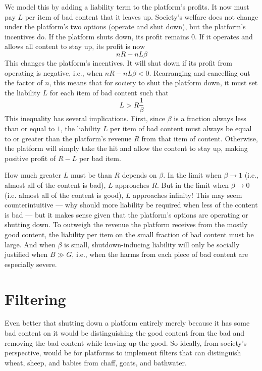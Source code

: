 \documentclass{article}
\begin{document}
We model this by adding a liability term to the platform's profits. It now must pay $L$ per item of bad content that it leaves up. Society's welfare does not change under the platform's two options (operate and shut down), but the platform's incentives do. If the platform shuts down, its profit remains $0$.  If it operates and allows all content to stay up, its  profit is now 
\begin{equation}
\label{profnofilter}
nR - nL\beta
\end{equation}
This changes the platform's incentives. It will shut down if its profit from operating is negative, i.e., when $nR - nL\beta < 0$. Rearranging and cancelling out the factor of $n$, this means that for society to shut the platform down, it must set the liability $L$ for each item of bad content such that
\begin{equation*}
L > R\frac{1}{\beta}
\end{equation*}
This inequality has several implications. First, since $\beta$ is a fraction always less than or equal to $1$, the liability $L$ per item of bad content must always be equal to or greater than the platform's revenue $R$ from that item of content. Otherwise, the platform will simply take the hit and allow the content to stay up, making positive profit of $R -L$ per bad item.

How much greater $L$ must be than $R$ depends on $\beta$. In the limit when $\beta \rightarrow 1$ (i.e., almost all of the content is bad), $L$ approaches $R$. But in the limit when $\beta \rightarrow 0$ (i.e. almost all of the content is good), $L$ approaches infinity! This may seem counterintuitive --- why should more liability be required when less of the content is bad --- but it makes sense given that the platform's options are operating or shutting down. To outweigh the revenue the platform receives from the mostly good content, the liability per item on the small fraction of bad content must be large. And when $\beta$ is small, shutdown-inducing liability will only be socially justified when $B \gg G$, i.e., when the harms from each piece of bad content are especially severe.

\section{Filtering}

Even better that shutting down a platform entirely merely because it has some bad content on it would be distinguishing the good content from the bad and removing the bad content while leaving up the good.  So ideally, from society's perspective, would be for platforms to implement filters that can distinguish wheat, sheep, and babies from chaff, goats, and bathwater.
\end{document}
